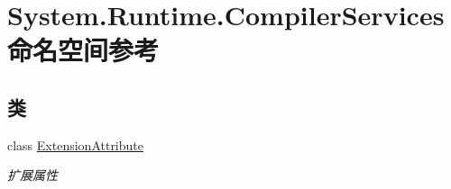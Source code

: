 \hypertarget{namespace_system_1_1_runtime_1_1_compiler_services}{}\section{System.\+Runtime.\+Compiler\+Services 命名空间参考}
\label{namespace_system_1_1_runtime_1_1_compiler_services}
\subsection*{类}
\begin{DoxyCompactItemize}
\item 
class \hyperlink{class_system_1_1_runtime_1_1_compiler_services_1_1_extension_attribute}{Extension\+Attribute}
\begin{DoxyCompactList}\small\item\em 扩展属性 \end{DoxyCompactList}\end{DoxyCompactItemize}
